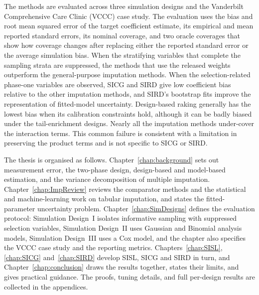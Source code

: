 The methods are evaluated across three simulation designs and the Vanderbilt Comprehensive Care Clinic (VCCC) case study. The evaluation uses the bias and root mean squared error of the target coefficient estimate, its empirical and mean reported standard errors, its nominal coverage, and two oracle coverages that show how coverage changes after replacing either the reported standard error or the average simulation bias. When the stratifying variables that complete the sampling strata are suppressed, the methods that use the released weights outperform the general-purpose imputation methods. When the selection-related phase-one variables are observed, SICG and SIRD give low coefficient bias relative to the other imputation methods, and SIRD's bootstrap fits improve the representation of fitted-model uncertainty. Design-based raking generally has the lowest bias when its calibration constraints hold, although it can be badly biased under the tail-enrichment designs. Nearly all the imputation methods under-cover the interaction terms. This common failure is consistent with a limitation in preserving the product terms and is not specific to SICG or SIRD.

The thesis is organised as follows. Chapter~\ref{chap:background} sets out measurement error, the two-phase design, design-based and model-based estimation, and the variance decomposition of multiple imputation. Chapter~\ref{chap:ImpReview} reviews the comparator methods and the statistical and machine-learning work on tabular imputation, and states the fitted-parameter uncertainty problem. Chapter~\ref{chap:SimDesigns} defines the evaluation protocol: Simulation Design~I isolates informative sampling with suppressed selection variables, Simulation Design~II uses Gaussian and Binomial analysis models, Simulation Design~III uses a Cox model, and the chapter also specifies the VCCC case study and the reporting metrics. Chapters~\ref{chap:SISL}, \ref{chap:SICG} and~\ref{chap:SIRD} develop SISL, SICG and SIRD in turn, and Chapter~\ref{chap:conclusion} draws the results together, states their limits, and gives practical guidance. The proofs, tuning details, and full per-design results are collected in the appendices.
